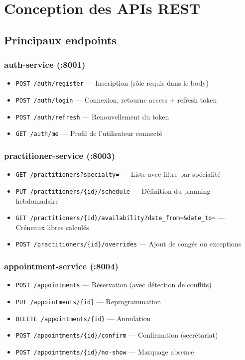 \documentclass[12pt,a4paper]{article}
\begin{document}
\section{Conception des APIs REST}

\subsection{Principaux endpoints}

\subsubsection{auth-service (:8001)}
\begin{itemize}
  \item \texttt{POST /auth/register} — Inscription (rôle requis dans le body)
  \item \texttt{POST /auth/login} — Connexion, retourne access + refresh token
  \item \texttt{POST /auth/refresh} — Renouvellement du token
  \item \texttt{GET /auth/me} — Profil de l'utilisateur connecté
\end{itemize}

\subsubsection{practitioner-service (:8003)}
\begin{itemize}
  \item \texttt{GET /practitioners?specialty=} — Liste avec filtre par spécialité
  \item \texttt{PUT /practitioners/\{id\}/schedule} — Définition du planning hebdomadaire
  \item \texttt{GET /practitioners/\{id\}/availability?date\_from=\&date\_to=} — Créneaux libres calculés
  \item \texttt{POST /practitioners/\{id\}/overrides} — Ajout de congés ou exceptions
\end{itemize}

\subsubsection{appointment-service (:8004)}
\begin{itemize}
  \item \texttt{POST /appointments} — Réservation (avec détection de conflits)
  \item \texttt{PUT /appointments/\{id\}} — Reprogrammation
  \item \texttt{DELETE /appointments/\{id\}} — Annulation
  \item \texttt{POST /appointments/\{id\}/confirm} — Confirmation (secrétariat)
  \item \texttt{POST /appointments/\{id\}/no-show} — Marquage absence
\end{itemize}
\end{document}
